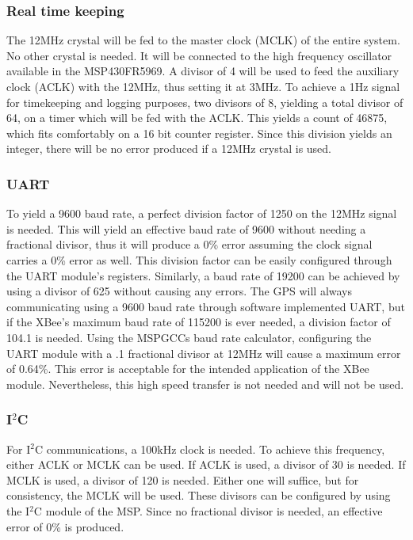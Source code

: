 \subsubsection{Real time keeping}
The 12MHz crystal will be fed to the master clock (MCLK) of the entire system. No other crystal is needed. It will be connected to the high frequency oscillator available in the MSP430FR5969. A divisor of 4 will be used to feed the auxiliary clock (ACLK) with the 12MHz, thus setting it at 3MHz. To achieve a 1Hz signal for timekeeping and logging purposes, two divisors of 8, yielding a total divisor of 64, on a timer which will be fed with the ACLK. This yields a count of 46875, which fits comfortably on a 16 bit counter register. Since this division yields an integer, there will be no error produced if a 12MHz crystal is used.

\subsubsection{UART}
To yield a 9600 baud rate, a perfect division factor of 1250 on the 12MHz signal is needed. This will yield an effective baud rate of 9600 without needing a fractional divisor, thus it will produce a 0\% error assuming the clock signal carries a 0\% error as well. This division factor can be easily configured through the UART module's registers. Similarly, a baud rate of 19200 can be achieved by using a divisor of 625 without causing any errors. The GPS will always communicating using a 9600 baud rate through software implemented UART, but if the XBee's maximum baud rate of 115200 is ever needed, a division factor of 104.1 is needed. Using the MSPGCCs baud rate calculator, configuring the UART module with a .1 fractional divisor at 12MHz will cause a maximum error of 0.64\%. This error is acceptable for the intended application of the XBee module. Nevertheless, this high speed transfer is not needed and will not be used.

\subsubsection{I$^2$C}
For I$^2$C communications, a 100kHz clock is needed. To achieve this frequency, either ACLK or MCLK can be used. If ACLK is used, a divisor of 30 is needed. If MCLK is used, a divisor of 120 is needed. Either one will suffice, but for consistency, the MCLK will be used. These divisors can be configured by using the I$^2$C module of the MSP. Since no fractional divisor is needed, an effective error of 0\% is produced.

